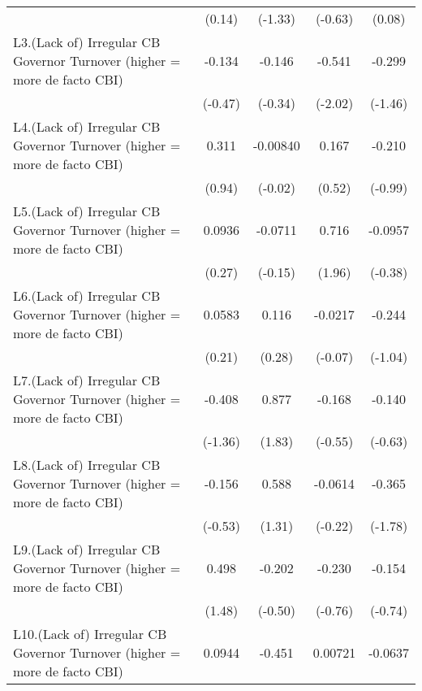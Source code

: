 {\begin{tabular}{l*{4}{c}}
                &   (0.14)         &  (-1.33)         &  (-0.63)         &   (0.08)         \\
[1em]
L3.(Lack of) Irregular CB Governor Turnover (higher = more de facto CBI)&   -0.134         &   -0.146         &   -0.541\sym{*}  &   -0.299         \\
                &  (-0.47)         &  (-0.34)         &  (-2.02)         &  (-1.46)         \\
[1em]
L4.(Lack of) Irregular CB Governor Turnover (higher = more de facto CBI)&    0.311         & -0.00840         &    0.167         &   -0.210         \\
                &   (0.94)         &  (-0.02)         &   (0.52)         &  (-0.99)         \\
[1em]
L5.(Lack of) Irregular CB Governor Turnover (higher = more de facto CBI)&   0.0936         &  -0.0711         &    0.716         &  -0.0957         \\
                &   (0.27)         &  (-0.15)         &   (1.96)         &  (-0.38)         \\
[1em]
L6.(Lack of) Irregular CB Governor Turnover (higher = more de facto CBI)&   0.0583         &    0.116         &  -0.0217         &   -0.244         \\
                &   (0.21)         &   (0.28)         &  (-0.07)         &  (-1.04)         \\
[1em]
L7.(Lack of) Irregular CB Governor Turnover (higher = more de facto CBI)&   -0.408         &    0.877         &   -0.168         &   -0.140         \\
                &  (-1.36)         &   (1.83)         &  (-0.55)         &  (-0.63)         \\
[1em]
L8.(Lack of) Irregular CB Governor Turnover (higher = more de facto CBI)&   -0.156         &    0.588         &  -0.0614         &   -0.365         \\
                &  (-0.53)         &   (1.31)         &  (-0.22)         &  (-1.78)         \\
[1em]
L9.(Lack of) Irregular CB Governor Turnover (higher = more de facto CBI)&    0.498         &   -0.202         &   -0.230         &   -0.154         \\
                &   (1.48)         &  (-0.50)         &  (-0.76)         &  (-0.74)         \\
[1em]
L10.(Lack of) Irregular CB Governor Turnover (higher = more de facto CBI)&   0.0944         &   -0.451         &  0.00721         &  -0.0637         \\

\end{tabular}}
